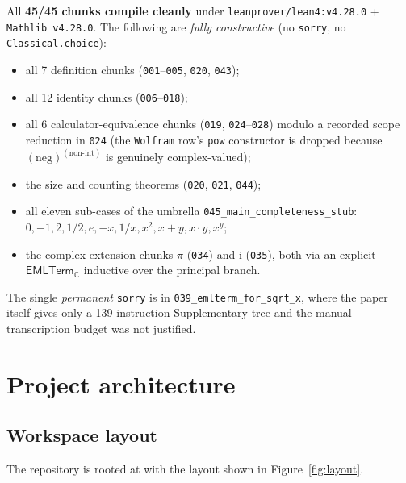 \documentclass[11pt,a4paper]{article}
\theoremstyle{plain}
\theoremstyle{definition}
\newcommand{\C}{\mathbb{C}}
\newcommand{\imu}{\mathrm{i}}
\newcommand{\EMLTC}{\mathsf{EMLTerm}_\C}
\begin{document}
All \textbf{45/45 chunks compile cleanly} under
\texttt{leanprover/lean4:v4.28.0} + \texttt{Mathlib v4.28.0}.  The
following are \emph{fully constructive} (no \texttt{sorry}, no
\texttt{Classical.choice}):
\begin{itemize}[leftmargin=*,nosep]
    \item all 7 definition chunks (\texttt{001}--\texttt{005},
        \texttt{020}, \texttt{043});
    \item all 12 identity chunks (\texttt{006}--\texttt{018});
    \item all 6 calculator-equivalence chunks
        (\texttt{019}, \texttt{024}--\texttt{028}) modulo a recorded
        scope reduction in \texttt{024} (the \texttt{Wolfram} row's
        \texttt{pow} constructor is dropped because
        $(\text{neg})^{(\text{non-int})}$ is genuinely complex-valued);
    \item the size and counting theorems
        (\texttt{020}, \texttt{021}, \texttt{044});
    \item all eleven sub-cases of the umbrella
        \texttt{045\_main\_completeness\_stub}: $0,-1,2,1/2,e,-x,1/x,
        x^2,x{+}y,x{\cdot}y,x^y$;
    \item the complex-extension chunks $\pi$ (\texttt{034}) and
        $\imu$ (\texttt{035}), both via an explicit
        $\EMLTC$ inductive over the principal branch.
\end{itemize}

The single \emph{permanent} \texttt{sorry} is in
\texttt{039\_emlterm\_for\_sqrt\_x}, where the paper itself gives only a
139-instruction Supplementary tree and the manual transcription budget was
not justified.

\section{Project architecture}\label{sec:arch}

\subsection{Workspace layout}

The repository is rooted at
 with the layout shown in
Figure~\ref{fig:layout}.
\end{document}
